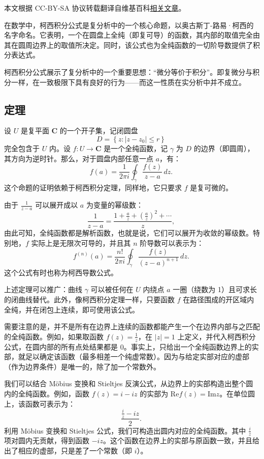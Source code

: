 
本文根据 CC-BY-SA 协议转载翻译自维基百科\href{https://en.wikipedia.org/wiki/Cauchy\%27s_integral_formula}{相关文章}。

在数学中，柯西积分公式是复分析中的一个核心命题，以奥古斯丁-路易·柯西的名字命名。它表明，一个在圆盘上全纯（即复可导）的函数，其内部的取值完全由其在圆周边界上的取值所决定。同时，该公式也为全纯函数的一切阶导数提供了积分表达式。

柯西积分公式展示了复分析中的一个重要思想：“微分等价于积分”。即复微分与积分一样，在一致极限下具有良好的行为——而这一性质在实分析中并不成立。
\subsection{定理}
设 $U$ 是复平面 $\mathbf{C}$ 的一个开子集，记闭圆盘
$$
D = \left\{ z : |z - z_0| \leq r \right\}~
$$
完全包含于 $U$ 内。设 $f: U \to \mathbf{C}$ 是一个全纯函数，记 $\gamma$ 为 $D$ 的边界（即圆周），其方向为逆时针。那么，对于圆盘内部任意一点 $a$，有：
$$
f(a) = \frac{1}{2\pi i} \oint_{\gamma} \frac{f(z)}{z - a} \, dz.~
$$
这个命题的证明依赖于柯西积分定理，同样地，它只要求 $f$ 是复可微的。

由于 $\frac{1}{z - a}$ 可以展开成以 $a$ 为变量的幂级数：
$$
\frac{1}{z - a} = \frac{1 + \frac{a}{z} + \left( \frac{a}{z} \right)^2 + \cdots}{z}  ,~
$$
由此可知，全纯函数都是解析函数，也就是说，它们可以展开为收敛的幂级数。特别地，$f$ 实际上是无限次可导的，并且其 $n$ 阶导数可以表示为：
$$
f^{(n)}(a) = \frac{n!}{2\pi i} \oint_{\gamma} \frac{f(z)}{(z - a)^{n+1}} \, dz.~
$$
这个公式有时也称为柯西导数公式。

上述定理可以推广：曲线 $\gamma$ 可以被任何在 $U$ 内绕点 $a$ 一圈（绕数为 1）且可求长的闭曲线替代。此外，像柯西积分定理一样，只要函数 $f$ 在路径围成的开区域内全纯，并在闭包上连续，即可使用该公式。

需要注意的是，并不是所有在边界上连续的函数都能产生一个在边界内部与之匹配的全纯函数。例如，如果取函数 $f(z) = \frac{1}{z}$，在 $|z| = 1$ 上定义，并代入柯西积分公式，在圆内部的所有点处结果都是 0。事实上，只给出一个全纯函数边界上的实部，就足以确定该函数（最多相差一个纯虚常数）。因为与给定实部对应的虚部（作为边界条件）是唯一的，除了加一个常数外。

我们可以结合 Möbius 变换和 Stieltjes 反演公式，从边界上的实部构造出整个圆内的全纯函数。例如，函数 $f(z) = i - iz$ 的实部为 $\text{Re} f(z) = \text{Im} z$。在单位圆上，该函数可表示为：
$$
\frac{\frac{i}{z} - iz}{2}.~
$$
利用 Möbius 变换和 Stieltjes 公式，我们可构造出圆内对应的全纯函数。其中 $\frac{i}{z}$ 项对圆内无贡献，得到函数 $-iz$。这个函数在边界上的实部与原函数一致，并且给出了相应的虚部，只是差了一个常数（即 $i$）。
